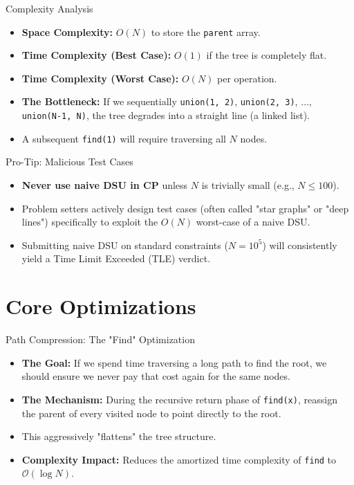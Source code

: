\documentclass{beamer}
\begin{document}
\begin{frame}{Complexity Analysis}
    \begin{itemize}
        \item \textbf{Space Complexity:} $O(N)$ to store the \texttt{parent} array.
        \item \textbf{Time Complexity (Best Case):} $O(1)$ if the tree is completely flat.
        \item \textbf{Time Complexity (Worst Case):} $O(N)$ per operation.
        \item \textbf{The Bottleneck:} If we sequentially \texttt{union(1, 2)}, \texttt{union(2, 3)}, $\dots$, \texttt{union(N-1, N)}, the tree degrades into a straight line (a linked list).
        \item A subsequent \texttt{find(1)} will require traversing all $N$ nodes.
    \end{itemize}
\end{frame}

\begin{frame}{Pro-Tip: Malicious Test Cases}
    \begin{itemize}
        \item \textbf{Never use naive DSU in CP} unless $N$ is trivially small (e.g., $N \le 100$).
        \item Problem setters actively design test cases (often called "star graphs" or "deep lines") specifically to exploit the $O(N)$ worst-case of a naive DSU.
        \item Submitting naive DSU on standard constraints ($N = 10^5$) will consistently yield a Time Limit Exceeded (TLE) verdict.
    \end{itemize}
\end{frame}

\section{Core Optimizations}

\begin{frame}{Path Compression: The "Find" Optimization}
    \begin{itemize}
        \item \textbf{The Goal:} If we spend time traversing a long path to find the root, we should ensure we never pay that cost again for the same nodes.
        \item \textbf{The Mechanism:} During the recursive return phase of \texttt{find(x)}, reassign the parent of every visited node to point directly to the root.
        \item This aggressively "flattens" the tree structure.
        \item \textbf{Complexity Impact:} Reduces the amortized time complexity of \texttt{find} to $\mathcal{O}(\log N)$.
    \end{itemize}
\end{frame}
\end{document}
